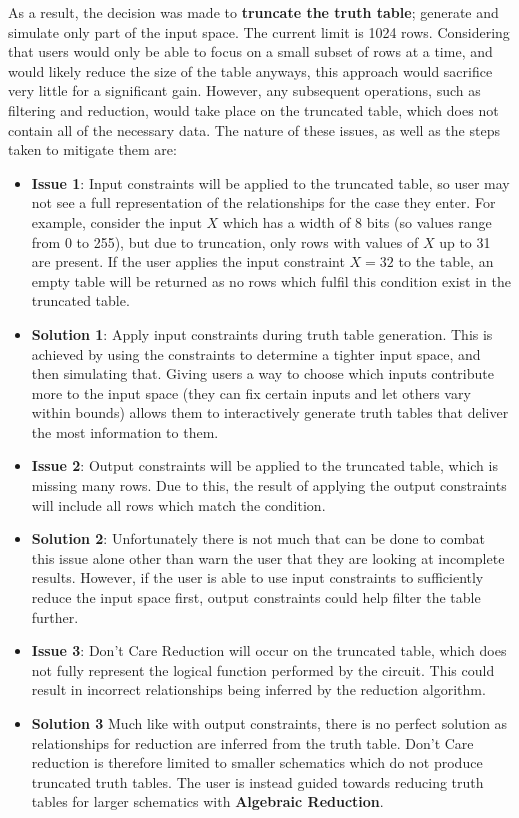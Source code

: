 As a result, the decision was made to \textbf{truncate the truth table}; generate and simulate only part of the input space. The current limit is 1024 rows. Considering that users would only be able to focus on a small subset of rows at a time, and would likely reduce the size of the table anyways, this approach would sacrifice very little for a significant gain. However, any subsequent operations, such as filtering and reduction, would take place on the truncated table, which does not contain all of the necessary data. The nature of these issues, as well as the steps taken to mitigate them are:

\begin{itemize}
    \item[] \textbf{Issue 1}: Input constraints will be applied to the truncated table, so user may not see a full representation of the relationships for the case they enter. For example, consider the input $X$ which has a width of 8 bits (so values range from 0 to 255), but due to truncation, only rows with values of $X$ up to 31 are present. If the user applies the input constraint $X = 32$ to the table, an empty table will be returned as no rows which fulfil this condition exist in the truncated table.
    \item[] \textbf{Solution 1}: Apply input constraints during truth table generation. This is achieved by using the constraints to determine a tighter input space, and then simulating that. Giving users a way to choose which inputs contribute more to the input space (they can fix certain inputs and let others vary within bounds) allows them to interactively generate truth tables that deliver the most information to them.
    \item [] \textbf{Issue 2}: Output constraints will be applied to the truncated table, which is missing many rows. Due to this, the result of applying the output constraints will include all rows which match the condition.
    \item [] \textbf{Solution 2}: Unfortunately there is not much that can be done to combat this issue alone other than warn the user that they are looking at incomplete results. However, if the user is able to use input constraints to sufficiently reduce the input space first, output constraints could help filter the table further.
    \item [] \textbf{Issue 3}: Don't Care Reduction will occur on the truncated table, which does not fully represent the logical function performed by the circuit. This could result in incorrect relationships being inferred by the reduction algorithm.
    \item [] \textbf{Solution 3} Much like with output constraints, there is no perfect solution as relationships for reduction are inferred from the truth table. Don't Care reduction is therefore limited to smaller schematics which do not produce truncated truth tables. The user is instead guided towards reducing truth tables for larger schematics with \textbf{Algebraic Reduction}.
\end{itemize}

